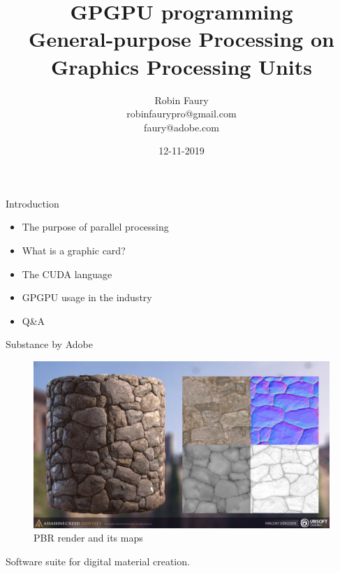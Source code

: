 \documentclass{beamer}
\title{GPGPU programming\\General-purpose Processing on Graphics Processing Units}
\author{Robin Faury\\robinfaurypro@gmail.com\\faury@adobe.com}
\date{12-11-2019}
\begin{document}
\begin{frame}
\titlepage
\end{frame}

\begin{frame}{Introduction}
	\begin{itemize}
		\item The purpose of parallel processing
		\item What is a graphic card?
		\item The CUDA language
		\item GPGPU usage in the industry
		\item Q\&A
	\end{itemize}
\end{frame}

\begin{frame}{Substance by Adobe}
	\begin{figure}
		\includegraphics[scale=0.15]{figures/vincent-derozier-assassin-s-creed-odyssey.jpg}
		\caption{PBR render and its maps}
	\end{figure}
	Software suite for digital material creation.
\end{frame}
\end{document}

